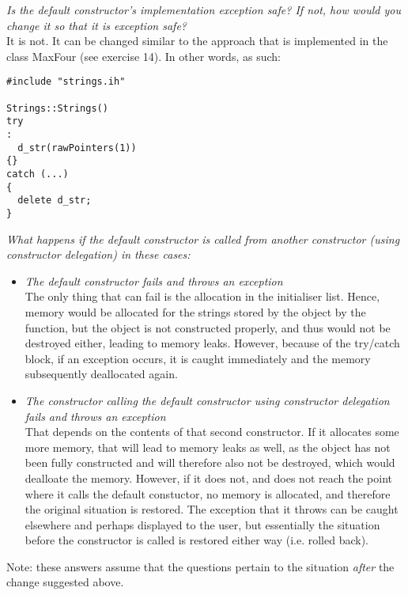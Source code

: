 \textit{Is the default constructor's implementation exception safe? If not, how would you change it so that it is exception safe?} \\
It is not. It can be changed similar to the approach that is implemented in the class MaxFour (see exercise 14). In other words, as such: \\
\begin{lstlisting}[style=in, caption=c\_strings.cc]
#include "strings.ih"

Strings::Strings()
try
:
  d_str(rawPointers(1))
{}
catch (...)
{
  delete d_str;
}
\end{lstlisting}

\textit{What happens if the default constructor is called from another constructor (using constructor delegation) in these cases:}

\begin{itemize}
  \item \textit{The default constructor fails and throws an exception} \\
    The only thing that can fail is the allocation in the initialiser list. Hence, memory would be allocated for the strings stored by the object by the  function, but the object is not constructed properly, and thus would not be destroyed either, leading to memory leaks. However, because of the try/catch block, if an exception occurs, it is caught immediately and the memory subsequently deallocated again.
  \item \textit{The constructor calling the default constructor using constructor delegation fails and throws an exception} \\
    That depends on the contents of that second constructor. If it allocates some more memory, that will lead to memory leaks as well, as the object has not been fully constructed and will therefore also not be destroyed, which would dealloate the memory. However, if it does not, and does not reach the point where it calls the default constuctor, no memory is allocated, and therefore the original situation is restored. The exception that it throws can be caught elsewhere and perhaps displayed to the user, but essentially the situation before the constructor is called is restored either way (i.e. rolled back).
\end{itemize}

Note: these answers assume that the questions pertain to the situation \textit{after} the change suggested above.

